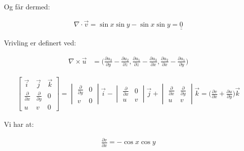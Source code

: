 \documentclass{article}
\newcommand{\answer}[1]{\underline{\underline{#1}}}
\begin{document}
\begin{flushle}
\bigskip

\begin{flushleft}
Og får dermed:
\end{flushleft}

\begin{align*}
\nabla \cdot \vec{v} = \sin{x}\sin{y} - \sin{x}\sin{y} = \answer{0}
\end{align*}

\newpage


\begin{flushleft}
Vrivling er definert ved:
\end{flushleft}

\begin{align*}
\nabla \times \vec{u} & = \bigg( \frac{\partial u_3}{\partial y}- \frac{\partial u_2}{\partial z} , \frac{\partial u_1}{\partial z}- \frac{\partial u_3}{\partial x} , \frac{\partial u_2}{\partial x}- \frac{\partial u_1}{\partial y} \bigg)
\end{align*}

\begin{align*}
\begin{bmatrix}
\vec{i} & \vec{j} & \vec{k} \\
\frac{\partial}{\partial x} & \frac{\partial}{\partial y} & 0 \\ u & v & 0 \end{bmatrix} 
 = \begin{vmatrix}\frac{\partial}{\partial y} & 0 \\ v & 0\end{vmatrix}\vec{i} - 
 \begin{vmatrix}\frac{\partial}{\partial x} & 0 \\ u & v\end{vmatrix}\vec{j} + 
 \begin{vmatrix}\frac{\partial}{\partial x} & \frac{\partial}{\partial y} \\ u & v\end{vmatrix}\vec{k} = \bigg(\frac{\partial v}{\partial x} + \frac{\partial u}{\partial y} \bigg)\vec{k}
\end{align*}

\bigskip

\begin{flushleft}
Vi har at:
\end{flushleft}
\begin{multicols}{2}
\begin{align*}
\frac{\partial v}{\partial x} = -\cos{x}\cos{y}
\end{align*}


\end{multicols}
\end{flushle}
\end{document}
